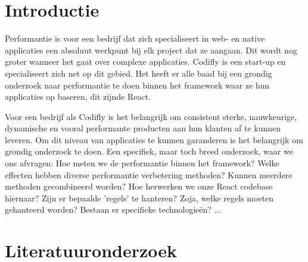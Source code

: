 \documentclass[fleqn,10pt]{voorstel}
\affiliation{\textbf{Contact:}
  \textsuperscript{1} \href{mailto:matthias.tison.w0715@student.hogent.be}{matthias.tison.w0715@student.hogent.be};
  \textsuperscript{2} \href{mailto:Arvid@Codifly.be}{Arvid@Codifly.be}}
\begin{document}
\maketitle %
\tableofcontents %
\thispagestyle{empty} %



\section{Introductie} %
\label{sec:introductie}

Performantie is voor een bedrijf dat zich specialiseert in web- en native applicaties een absoluut werkpunt bij elk project dat ze aangaan. Dit wordt nog groter wanneer het gaat over complexe applicaties. Codifly is een start-up en specialiseert zich net op dit gebied. Het heeft er alle baad bij een grondig onderzoek naar performantie te doen binnen het framework waar ze hun applicaties op baseren, dit zijnde React.

Voor een bedrijf als Codifly is het belangrijk om consistent sterke, nauwkeurige, dynamische en vooral performante producten aan hun klanten af te kunnen leveren. Om dit niveau van applicaties te kunnen garanderen is het belangrijk om grondig onderzoek te doen.
Een specifiek, maar toch breed onderzoek, waar we ons afvragen: Hoe meten we de performantie binnen het framework? Welke effecten hebben diverse performantie verbetering methoden? Kunnen meerdere methoden gecombineerd worden? Hoe herwerken we onze React codebase hiernaar? Zijn er bepaalde 'regels' te hanteren? Zoja, welke regels moeten gehanteerd worden? Bestaan er specifieke technologieën? ...



\section{Literatuuronderzoek}
\end{document}
